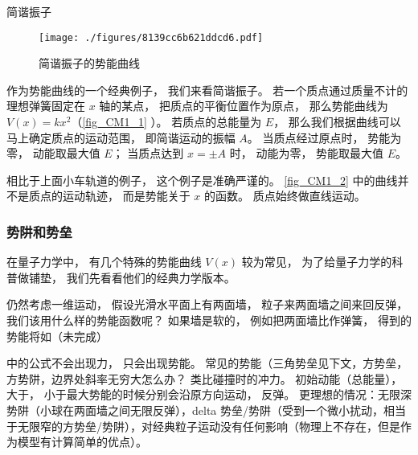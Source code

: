 \begin{example}{简谐振子}\label{ex_CM1_1}
\begin{figure}[ht]
\centering
\texttt{[image: ./figures/8139cc6b621ddcd6.pdf]}
\caption{简谐振子的势能曲线} \label{fig_CM1_2}
\end{figure}

作为势能曲线的一个经典例子， 我们来看简谐振子。 若一个质点通过质量不计的理想弹簧固定在 $x$ 轴的某点， 把质点的平衡位置作为原点， 那么势能曲线为 $V(x) = kx^2$（\autoref{fig_CM1_1} ）。 若质点的总能量为 $E$， 那么我们根据曲线可以马上确定质点的运动范围， 即简谐运动的振幅 $A$。 当质点经过原点时， 势能为零， 动能取最大值 $E$； 当质点达到 $x = \pm A$ 时， 动能为零， 势能取最大值 $E$。
\end{example}
相比于上面小车轨道的例子， 这个例子是准确严谨的。 \autoref{fig_CM1_2} 中的曲线并不是质点的运动轨迹， 而是势能关于 $x$ 的函数。 质点始终做直线运动。

\subsubsection{势阱和势垒}
在量子力学中， 有几个特殊的势能曲线 $V(x)$ 较为常见， 为了给量子力学的科普做铺垫， 我们先看看他们的经典力学版本。



仍然考虑一维运动， 假设光滑水平面上有两面墙， 粒子来两面墙之间来回反弹， 我们该用什么样的势能函数呢？ 如果墙是软的， 例如把两面墙比作弹簧， 得到的势能将如（未完成）

中的公式不会出现力， 只会出现势能。 常见的势能（三角势垒见下文，方势垒，方势阱，边界处斜率无穷大怎么办？ 类比碰撞时的冲力。 初始动能（总能量）， 大于， 小于最大势能的时候分别会沿原方向运动， 反弹。 更理想的情况：无限深势阱（小球在两面墙之间无限反弹），delta 势垒/势阱（受到一个微小扰动，相当于无限窄的方势垒/势阱），对经典粒子运动没有任何影响（物理上不存在，但是作为模型有计算简单的优点）。
